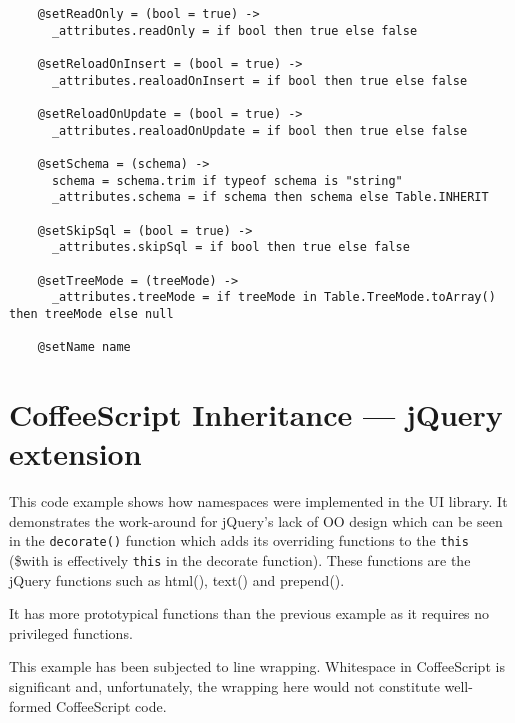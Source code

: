 \begin{lstlisting}
    @setReadOnly = (bool = true) ->
      _attributes.readOnly = if bool then true else false
      
    @setReloadOnInsert = (bool = true) ->
      _attributes.realoadOnInsert = if bool then true else false
      
    @setReloadOnUpdate = (bool = true) ->
      _attributes.realoadOnUpdate = if bool then true else false
      
    @setSchema = (schema) ->
      schema = schema.trim if typeof schema is "string"
      _attributes.schema = if schema then schema else Table.INHERIT
      
    @setSkipSql = (bool = true) ->
      _attributes.skipSql = if bool then true else false
      
    @setTreeMode = (treeMode) ->
      _attributes.treeMode = if treeMode in Table.TreeMode.toArray() then treeMode else null
      
    @setName name
\end{lstlisting}

\clearpage
\section{CoffeeScript Inheritance --- jQuery extension}
This code example shows how namespaces were implemented in the UI library. It demonstrates the work-around for jQuery's lack of OO design which can be seen in the \texttt{decorate()} function which adds its overriding functions to the \texttt{this} (\$with is effectively \texttt{this} in the decorate function). These functions are the jQuery functions such as html(), text() and prepend().

It has more prototypical functions than the previous example as it requires no privileged functions.

This example has been subjected to line wrapping. Whitespace in Coffee\-Script is significant and, unfortunately, the wrapping here would not constitute well-formed Coffee\-Script code.

